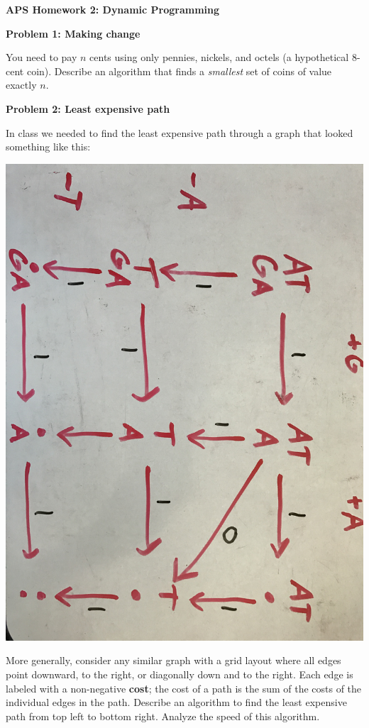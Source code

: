 \documentclass[]{article}
\begin{document}
\textbf{APS Homework 2: Dynamic Programming}

\medskip
\textbf{Problem 1: Making change}

You need to pay $n$ cents using only pennies, nickels, and octels (a hypothetical
8-cent coin). Describe an algorithm that finds a \textit{smallest} set of coins of value
exactly $n$.

\medskip
\textbf{Problem 2: Least expensive path}

In class we needed to find the least expensive path through a graph that looked
something like this:

\includegraphics[scale=0.05]{geneGraph}

More generally, consider any similar graph with a grid layout where all edges
point downward, to the right, or diagonally down and to the right. Each edge is
labeled with a non-negative \textbf{cost}; the cost of a path is the sum of the
costs of the individual edges in the path. Describe an algorithm to find the
least expensive path from top left to bottom right. Analyze the speed of this
algorithm.
\end{document}
